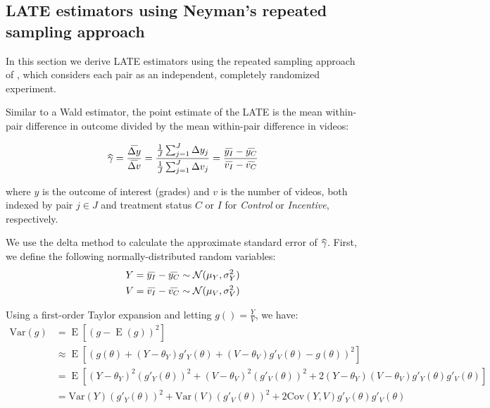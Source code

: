 \subsection{LATE estimators using Neyman's repeated sampling approach} \label{subsec:a_neyman_late}

In this section we derive LATE estimators using the repeated sampling approach of \textcite{neyman1923}, which considers each pair as an independent, completely randomized experiment.

Similar to a Wald estimator, the point estimate of the LATE is the mean within-pair difference in outcome divided by the mean within-pair difference in videos:

\begin{equation} \label{eq:neyman_late_spec}
	\wh{\gamma} = \frac{\wb{\Delta y}}{\wb{\Delta v}} = \frac{\frac{1}{J}\sum_{j=1}^{J} \Delta y_j }{\frac{1}{J}\sum_{j=1}^{J} \Delta v_j} = \frac{\wb{y_I} - \wb{y_C}}{\wb{v_I} - \wb{v_C}}
\end{equation}

where $y$ is the outcome of interest (grades) and $v$ is the number of videos, both indexed by pair $j\in J$ and treatment status $C$ or $I$ for \textit{Control} or \textit{Incentive}, respectively.

We use the delta method to calculate the approximate standard error of $\wh{\gamma}$.
First, we define the following normally-distributed random variables:
\begin{equation}
	\begin{split}
		Y = \wb{y_I} - \wb{y_C} \sim \mathcal{N}(\mu_Y, \sigma^2_Y) \\
		V = \wb{v_I} - \wb{v_C} \sim \mathcal{N}(\mu_V, \sigma^2_V)
	\end{split}\label{eq:equation1}
\end{equation}

Using a first-order Taylor expansion and letting $g() = \frac{Y}{V}$, we have:
\begin{equation}
	\begin{split}
		\text{Var}(g) & = \operatorname{E}[(g - \operatorname{E}(g))^2]                                                                                           \\
		              & \approx \operatorname{E}[(g(\theta) + (Y-\theta_Y)g'_Y(\theta) + (V-\theta_V)g'_V(\theta) - g(\theta))^2]                                 \\
		              & = \operatorname{E}[(Y-\theta_Y)^2 (g'_Y(\theta))^2 + (V-\theta_V)^2 (g'_V(\theta))^2 + 2(Y-\theta_Y)(V-\theta_V)g'_Y(\theta)g'_V(\theta)] \\
		              & = \text{Var}(Y)(g'_Y(\theta))^2 + \text{Var}(V)(g'_V(\theta))^2 + 2\text{Cov}(Y,V)g'_Y(\theta)g'_V(\theta)
	\end{split}\label{eq:equation2}
\end{equation}

